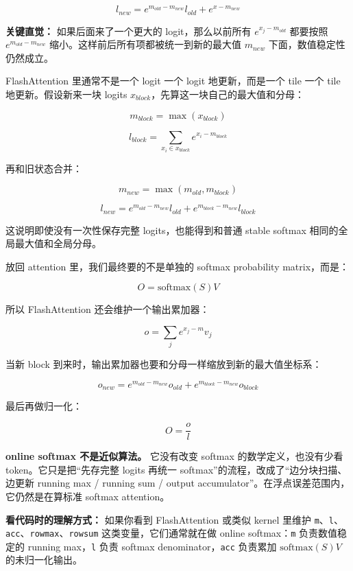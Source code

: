 \[
l_{new}
=
e^{m_{old}-m_{new}}l_{old}
+
e^{x-m_{new}}
\]

\begin{intubox}
\textbf{关键直觉：} 如果后面来了一个更大的 logit，那么以前所有 $e^{x_j-m_{old}}$ 都要按照 $e^{m_{old}-m_{new}}$ 缩小。这样前后所有项都被统一到新的最大值 $m_{new}$ 下面，数值稳定性仍然成立。
\end{intubox}

FlashAttention 里通常不是一个 logit 一个 logit 地更新，而是一个 tile 一个 tile 地更新。假设新来一块 logits $x_{block}$，先算这一块自己的最大值和分母：

\[
m_{block}=\max(x_{block})
\]

\[
l_{block}=\sum_{x_i\in x_{block}}e^{x_i-m_{block}}
\]

再和旧状态合并：

\[
m_{new}=\max(m_{old},m_{block})
\]

\[
l_{new}
=
e^{m_{old}-m_{new}}l_{old}
+
e^{m_{block}-m_{new}}l_{block}
\]

这说明即使没有一次性保存完整 logits，也能得到和普通 stable softmax 相同的全局最大值和全局分母。

放回 attention 里，我们最终要的不是单独的 softmax probability matrix，而是：

\[
O=\mathrm{softmax}(S)V
\]

所以 FlashAttention 还会维护一个输出累加器：

\[
o=\sum_j e^{x_j-m}v_j
\]

当新 block 到来时，输出累加器也要和分母一样缩放到新的最大值坐标系：

\[
o_{new}
=
e^{m_{old}-m_{new}}o_{old}
+
e^{m_{block}-m_{new}}o_{block}
\]

最后再做归一化：

\[
O=\frac{o}{l}
\]

\begin{warnbox}
\textbf{online softmax 不是近似算法。} 它没有改变 softmax 的数学定义，也没有少看 token。它只是把“先存完整 logits 再统一 softmax”的流程，改成了“边分块扫描、边更新 running max / running sum / output accumulator”。在浮点误差范围内，它仍然是在算标准 softmax attention。
\end{warnbox}

\begin{summarybox}
\textbf{看代码时的理解方式：} 如果你看到 FlashAttention 或类似 kernel 里维护 \texttt{m}、\texttt{l}、\texttt{acc}、\texttt{rowmax}、\texttt{rowsum} 这类变量，它们通常就在做 online softmax：\texttt{m} 负责数值稳定的 running max，\texttt{l} 负责 softmax denominator，\texttt{acc} 负责累加 $\mathrm{softmax}(S)V$ 的未归一化输出。
\end{summarybox}

